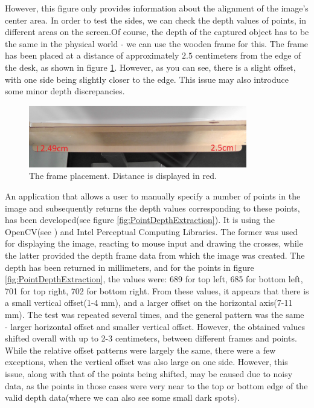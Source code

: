 \documentclass[]{article}
\begin{document}
 However, this figure only provides information about the alignment of the image's center area. In order to test the sides, we can check the depth values of points, in different areas on the screen.Of course, the depth of the captured object has to be the same in the physical world - we can use the wooden frame for this. The frame has been placed at a distance of approximately $2.5$ centimeters from the edge of the desk, as shown in figure \ref{fig:FramePlacement}. However, as you can see, there is a slight offset, with one side being slightly closer to the edge. This issue may also introduce some minor depth discrepancies. 
 
 \begin{figure}[!hbtp]
     \centering
     \includegraphics[width=0.85\textwidth]{figures/FramePlacementCM.jpg}
     \caption{The frame placement. Distance is displayed in red.}
     \label{fig:FramePlacement}
 \end{figure}
 
An application that allows a user to manually specify a number of points in the image and subsequently returns the depth values corresponding to these points, has been developed(see figure \ref{fig:PointDepthExtraction}). It is using the OpenCV(see \cite{opencv}) and Intel Perceptual Computing Libraries. The former was used for displaying the image, reacting to mouse input and drawing the crosses, while the latter provided the depth frame data from which the image was created. The depth has been returned in millimeters, and for the points in figure \ref{fig:PointDepthExtraction}, the values were: 689 for top left, 685 for bottom left, 701 for top right, 702 for bottom right. From these values, it appears that there is a small vertical offset(1-4 mm), and a larger offset on the horizontal axis(7-11 mm). The test was repeated several times, and the general pattern was the same - larger horizontal offset and smaller vertical offset. However, the obtained values shifted overall with up to 2-3 centimeters, between different frames and points. While the relative offset patterns were largely the same, there were a few exceptions, when the vertical offset was also large on one side. However, this issue, along with that of the points being shifted, may be caused due to noisy data, as the points in those cases were very near to the top or bottom edge of the valid depth data(where we can also see some small dark spots).
 
\end{document}
